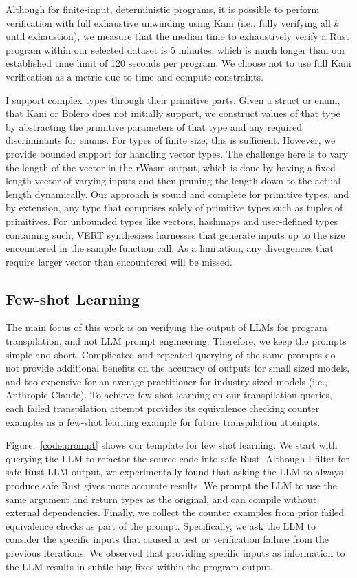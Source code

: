 \documentclass[12pt,openany,oneside,table]{cmuthesis}
\begin{document}
Although for finite-input, deterministic programs, it is possible to
perform verification with full exhaustive unwinding using Kani (i.e.,
fully verifying all $k$ until exhaustion), we measure that the median
time to exhaustively verify a Rust program within our selected dataset
is 5 minutes, which is much longer than our established time limit of
120 seconds per program. We choose not to use full Kani verification
as a metric due to time and compute constraints.


I support complex types through their primitive parts. Given a struct
or enum, that Kani or Bolero does not initially support, we construct
values of that type by abstracting the primitive parameters of that
type and any required discriminants for enums. For types of finite
size, this is sufficient. However, we provide bounded support for
handling vector types. The challenge here is to vary the length of the
vector in the rWasm output, which is done by having a fixed-length
vector of varying inputs and then pruning the length down to the
actual length dynamically. Our approach is sound and complete for
primitive types, and by extension, any type that comprises solely of
primitive types such as tuples of primitives. For unbounded types like
vectors, hashmaps and user-defined types containing such, VERT
synthesizes harnesses that generate inputs up to the size encountered
in the sample function call. As a limitation, any divergences that
require larger vector than encountered will be missed.


\subsection{Few-shot Learning}
\label{sec:fewshot}
The main focus of this work is on verifying the output of LLMs for program transpilation, and not LLM prompt engineering. Therefore, we keep the prompts simple and short. Complicated and repeated querying of the same prompts do not provide additional benefits on the accuracy of outputs for small sized models, and too expensive for an average practitioner for industry sized models (i.e., Anthropic Claude).
To achieve few-shot learning on our transpilation queries, each failed transpilation attempt provides its equivalence checking counter examples as a few-shot learning example for future transpilation attempts. 

Figure.~\ref{code:prompt} shows our template for few shot learning. We start with querying the LLM to refactor the source code into safe Rust. Although I filter for safe Rust LLM output, we experimentally found that asking the LLM to always produce safe Rust gives more accurate results. We prompt the LLM to use the same argument and return types as the original, and can compile without external dependencies. Finally, we collect the counter examples from prior failed equivalence checks as part of the prompt. Specifically, we ask the LLM to consider the specific inputs that caused a test or verification failure from the previous iterations. We observed that providing specific inputs as information to the LLM results in subtle bug fixes within the program output.
\end{document}
